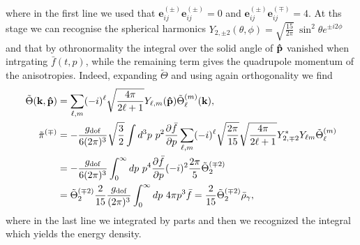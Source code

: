 where in the first line we used that $\boldsymbol{e}_{ij}^{(\pm)}\boldsymbol{e}_{ij}^{(\pm)}=0$ and $\boldsymbol{e}_{ij}^{(\pm)}\boldsymbol{e}_{ij}^{(\mp)}=4$. At ths stage we can recognise the spherical harmonics $Y_{2,\pm2}(\theta,\phi)=\sqrt{\frac{15}{2\pi}}\ \sin^2\theta e^{\pm i2\phi}$ and that by othronormality the integral over the solid angle of $\mathbf{\hat{p}}$ vanished when intrgating $\bar f(t,p)$, while the remaining term gives the quadrupole momentum of the anisotropies. Indeed, expanding $\tilde \Theta$ and using again orthogonality we find
\begin{align*}
    \tilde{\Theta}(\mathbf{k},\versor p)&=\sum_{\ell,m}(-i)^{\ell}\sqrt{\frac{4\pi}{2\ell+1}}Y_{\ell, m}(\versor p)\tilde\Theta_{\ell}^{(m)}(\mathbf k),\\
    \tilde \pi^{(\mp)}&=-\frac{g_\text{dof}}{6(2\pi)^3}\sqrt{\frac32}\int d^3p\ p^2 \frac{\partial\bar f}{\partial p}\sum_{\ell,m}(-i)^{\ell}\sqrt{\frac{2\pi}{15}}\sqrt{\frac{4\pi}{2\ell+1}}Y_{2,\mp2}^*Y_{\ell m}\tilde\Theta_{\ell}^{(m)}\\
    &=-\frac{g_\text{dof}}{6(2\pi)^3}\int_0^\infty dp\ p^4 \frac{\partial\bar f}{\partial p}(-i)^{2}\frac{2\pi}{5}\tilde\Theta_{2}^{(\mp2)}\\
    &=\tilde\Theta_{2}^{(\mp2)}\frac{2}{15}\frac{g_\text{dof}}{(2\pi)^3}\int_0^\infty dp\ 4\pi p^3 \bar f=\frac{2}{15}\tilde\Theta_2^{(\mp2)}\bar\rho_\gamma,
\end{align*}
where in the last line we integrated by parts and then we recognized the integral which yields the energy density.

